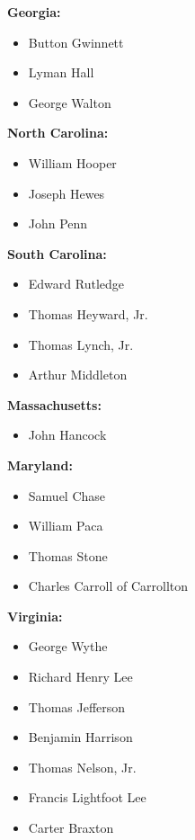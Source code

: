 \begin{multicols}{3}\raggedright
\begin{itemize}[wide,itemsep=8pt,label=,labelsep=*,]{\small


\item \textbf{Georgia:}
\begin{itemize}[wide,label=,itemsep=0pt,topsep=0pt]
\item Button Gwinnett
\item Lyman Hall
\item George Walton
\end{itemize}


\item \textbf{North Carolina:}
\begin{itemize}[wide,label=,itemsep=0pt,topsep=0pt]
\item William Hooper
\item Joseph Hewes
\item John Penn
\end{itemize}

\item \textbf{South Carolina:}
\begin{itemize}[wide,label=,itemsep=0pt,topsep=0pt]
\item Edward Rutledge
\item Thomas Heyward, Jr.
\item Thomas Lynch, Jr.
\item Arthur Middleton
\end{itemize}


\item \textbf{Massachusetts:}
\begin{itemize}[wide,label=,itemsep=0pt,topsep=0pt]
\item John Hancock
\end{itemize}

\item \textbf{Maryland:}
\begin{itemize}[wide,label=,itemsep=0pt,topsep=0pt]
\item Samuel Chase
\item William Paca
\item Thomas Stone
\item Charles Carroll of Carrollton
\end{itemize}

\item \textbf{Virginia:}
\begin{itemize}[wide,label=,itemsep=0pt,topsep=0pt]
\item George Wythe
\item Richard Henry Lee
\item Thomas Jefferson
\item Benjamin Harrison
\item Thomas Nelson, Jr.
\item Francis Lightfoot Lee
\item Carter Braxton
\end{itemize}

}
\end{itemize}
\end{multicols}
